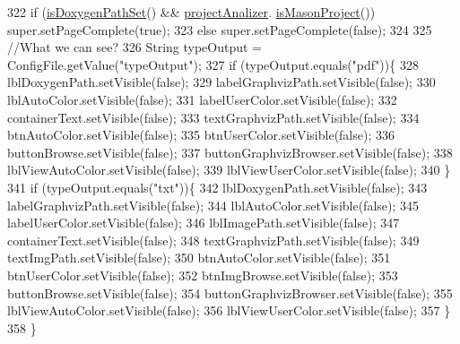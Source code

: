 \begin{DoxyCode}
322         \textcolor{keywordflow}{if} (\hyperlink{classit_1_1isislab_1_1masonassisteddocumentation_1_1mason_1_1wizards_1_1_b___project_information_page_a5b4f818a204c8f8a1934ceaf016cabd7}{isDoxygenPathSet}() && \hyperlink{classit_1_1isislab_1_1masonassisteddocumentation_1_1mason_1_1wizards_1_1_b___project_information_page_a5129feb0fa34a1d51e44a2fe495ac42c}{projectAnalizer}.
      \hyperlink{classit_1_1isislab_1_1masonassisteddocumentation_1_1mason_1_1analizer_1_1_project_analizer_ae6fe885ccc66aeb5c5d5ba6d09ed893c}{isMasonProject}()) super.setPageComplete(\textcolor{keyword}{true});
323         \textcolor{keywordflow}{else}    super.setPageComplete(\textcolor{keyword}{false});
324         
325         \textcolor{comment}{//What we can see?}
326         String typeOutput = ConfigFile.getValue(\textcolor{stringliteral}{"typeOutput"});
327         \textcolor{keywordflow}{if} (typeOutput.equals(\textcolor{stringliteral}{"pdf"}))\{
328             lblDoxygenPath.setVisible(\textcolor{keyword}{false});
329             labelGraphvizPath.setVisible(\textcolor{keyword}{false});
330             lblAutoColor.setVisible(\textcolor{keyword}{false});
331             labelUserColor.setVisible(\textcolor{keyword}{false});
332             containerText.setVisible(\textcolor{keyword}{false});
333             textGraphvizPath.setVisible(\textcolor{keyword}{false});
334             btnAutoColor.setVisible(\textcolor{keyword}{false});
335             btnUserColor.setVisible(\textcolor{keyword}{false});
336             buttonBrowse.setVisible(\textcolor{keyword}{false});
337             buttonGraphvizBrowser.setVisible(\textcolor{keyword}{false});
338             lblViewAutoColor.setVisible(\textcolor{keyword}{false});
339             lblViewUserColor.setVisible(\textcolor{keyword}{false});
340         \}
341         \textcolor{keywordflow}{if} (typeOutput.equals(\textcolor{stringliteral}{"txt"}))\{
342             lblDoxygenPath.setVisible(\textcolor{keyword}{false});
343             labelGraphvizPath.setVisible(\textcolor{keyword}{false});
344             lblAutoColor.setVisible(\textcolor{keyword}{false});
345             labelUserColor.setVisible(\textcolor{keyword}{false});
346             lblImagePath.setVisible(\textcolor{keyword}{false});
347             containerText.setVisible(\textcolor{keyword}{false});
348             textGraphvizPath.setVisible(\textcolor{keyword}{false});
349             textImgPath.setVisible(\textcolor{keyword}{false});
350             btnAutoColor.setVisible(\textcolor{keyword}{false});
351             btnUserColor.setVisible(\textcolor{keyword}{false});
352             btnImgBrowse.setVisible(\textcolor{keyword}{false});
353             buttonBrowse.setVisible(\textcolor{keyword}{false});
354             buttonGraphvizBrowser.setVisible(\textcolor{keyword}{false});
355             lblViewAutoColor.setVisible(\textcolor{keyword}{false});
356             lblViewUserColor.setVisible(\textcolor{keyword}{false});
357         \}   
358     \}
\end{DoxyCode}


